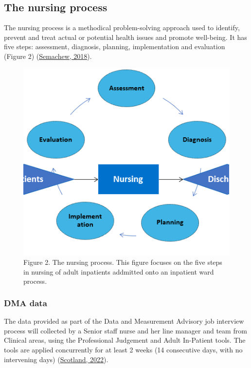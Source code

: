 \documentclass[
]{article}
\begin{document}
\hypertarget{the-nursing-process}{%
\subsection{The nursing process}\label{the-nursing-process}}

The nursing process is a methodical problem-solving approach used to
identify, prevent and treat actual or potential health issues and
promote well-being. It has five steps: assessment, diagnosis, planning,
implementation and evaluation (Figure 2)
(\protect\hyperlink{ref-semachew2018ImplementationNursingProcess}{Semachew,
2018}).

\begin{figure}
\centering
\includegraphics{./../../Output/Visuals/Adult inpatient care journey_Nursing.png}
\caption{Figure 2. The nursing process. This figure focuses on the five
steps in nursing of adult inpatients addmitted onto an inpatient ward
process.}
\end{figure}

\hypertarget{dma-data}{%
\subsubsection{DMA data}\label{dma-data}}

The data provided as part of the Data and Measurement Advisory job
interview process will collected by a Senior staff nurse and her line
manager and team from Clinical areas, using the Professional Judgement
and Adult In-Patient tools. The tools are applied concurrently for at
least 2 weeks (14 consecutive days, with no intervening days)
(\protect\hyperlink{ref-healthcareimprovementscotland2022AdultInpatientWorkload}{Scotland,
2022}).
\end{document}
